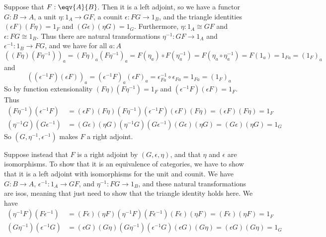 \noindent
Suppose that $F : \eqv{A}{B}$.  Then it is a left adjoint, so we have a
functor $G : B \to A$, a unit $\eta : 1_{A} \to GF$, a counit $\epsilon : FG
\to 1_{B}$, and the triangle identities $(\epsilon F)(F \eta) = 1_{F}$ and $(G
\epsilon)(\eta G) = 1_{G}$.  Furthermore, $\eta : 1_{A} \cong GF$ and $\epsilon
: FG \cong 1_{B}$.  Thus there are natural transformations $\eta^{-1} : GF \to
1_{A}$ and $\epsilon^{-1} : 1_{B} \to FG$, and we have for all $a : A$
\[
  \left((F\eta)(F\eta^{-1})\right)_{a}
  =
  (F\eta)_{a}(F\eta^{-1})_{a}
  =
  F(\eta_{a}) \circ F(\eta^{-1}_{a})
  =
  F(\eta_{a} \circ \eta^{-1}_{a})
  =
  F(1_{a})
  =
  1_{Fa}
  =
  (1_{F})_{a}
\]
and
\[
  \left((\epsilon^{-1}F)(\epsilon F)\right)_{a}
  =
  (\epsilon^{-1}F)_{a}(\epsilon F)_{a}
  =
  \epsilon^{-1}_{Fa} \circ \epsilon_{Fa}
  =
  1_{Fa}
  =
  (1_{F})_{a}
\]
So by function extensionality $(F\eta)(F\eta^{-1}) = 1_{F}$ and
$(\epsilon^{-1}F)(\epsilon F) = 1_{F}$.  Thus
\begin{align*}
  (F\eta^{-1})(\epsilon^{-1}F)
  &=
  (\epsilon F)(F\eta)
  (F\eta^{-1})(\epsilon^{-1}F)
  (\epsilon F)(F \eta)
  =
  (\epsilon F)
  (F \eta)
  =
  1_{F}
  \\
  (\eta^{-1}G)(G\epsilon^{-1})
  &=
  (G\epsilon)(\eta G)
  (\eta^{-1}G)(G\epsilon^{-1})
  (G\epsilon)(\eta G)
  =
  (G\epsilon)
  (\eta G)
  =
  1_{G}
\end{align*}
So $(G, \eta^{-1}, \epsilon^{-1})$ makes $F$ a right adjoint.


Suppose instead that $F$ is a right adjoint by $(G, \epsilon, \eta)$, and that
$\eta$ and $\epsilon$ are isomorphisms.  To show that it is an equivalence of
categories, we have to show that it is a left adjoint with isomorphisms for the
unit and counit.  We have $G : B \to A$, $\epsilon^{-1} : 1_{A} \to GF$, and
$\eta^{-1} : FG \to 1_{B}$, and these natural transformations are isos, meaning
that just need to show that the triangle identity holds here.  We have
\begin{align*}
  (\eta^{-1}F)(F\epsilon^{-1})
  &=
  (F\epsilon)(\eta F)
  (\eta^{-1}F)(F\epsilon^{-1})
  (F\epsilon)(\eta F)
  =
  (F\epsilon)
  (\eta F)
  =
  1_{F}
  \\
  (G \eta^{-1})(\epsilon^{-1} G)
  &=
  (\epsilon G)(G \eta)
  (G \eta^{-1})(\epsilon^{-1} G)
  (\epsilon G)(G \eta)
  =
  (\epsilon G)(G \eta)
  =
  1_{G}
\end{align*}


                  \begin{coqdoccode}
\end{coqdoccode}
